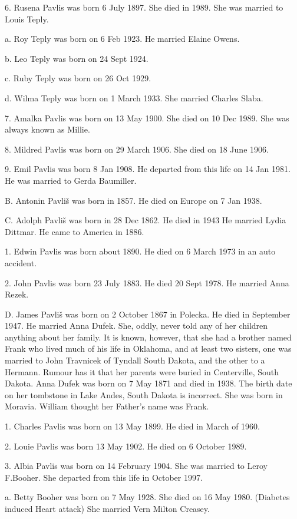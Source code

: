 \documentclass[a4paper]{article}
\begin{document}
6. Rusena Pavlis was born 6 July 1897.  She died in 1989.  She was married to Louis Teply.

a. Roy Teply was born on 6 Feb 1923.  He married Elaine Owens.

b. Leo Teply was born on 24 Sept 1924.  

c. Ruby Teply was born on 26 Oct 1929.

d. Wilma Teply was born on 1 March 1933.  She married Charles Slaba.

7. Amalka Pavlis was born on 13 May 1900.  She died on 10 Dec 1989.  She was always known as Millie.

8. Mildred Pavlis was born on 29 March 1906.  She died on 18 June 1906.

9. Emil Pavlis was born 8 Jan 1908.  He departed from this life on 14 Jan 1981. He was married to Gerda Baumiller.

B. Antonin Pavliš was born in 1857.  He died on Europe on 7 Jan 1938. 

C. Adolph Pavliš was born in 28 Dec 1862.  He died in 1943  He married Lydia Dittmar. He came to America in 1886.  

1. Edwin Pavlis was born about 1890.  He died on 6 March 1973 in an auto accident. 

2. John Pavlis was born 23 July 1883.  He died 20 Sept 1978. He married Anna Rezek.

D.  James Pavliš was born on 2 October 1867 in Polecka.  He died in September 1947.  He married Anna  Dufek.  She, oddly, never told any of her children anything about her family.  It is known, however, that she had a brother named Frank who lived much of his life in Oklahoma, and at least two  sisters, one was married to John Travnicek of Tyndall South Dakota, and the other to a Hermann.  Rumour has it that her parents were buried in Centerville, South Dakota.  Anna Dufek was born on 7 May 1871 and died in 1938. The birth date on her tombstone in Lake Andes, South Dakota is incorrect. She was born in Moravia.  William thought her Father's name was Frank.  

1. Charles Pavlis was born on 13 May 1899.  He died in March of 1960.  

2. Louie Pavlis was born 13 May 1902.  He died on 6 October 1989.

3. Albia Pavlis was born on 14 February 1904.  She was married to Leroy F.Booher. She departed from this life in October 1997.

a. Betty Booher was  born on 7 May 1928.  She died on 16 May 1980. (Diabetes induced  Heart attack)  She married Vern Milton Creasey.
\end{document}
